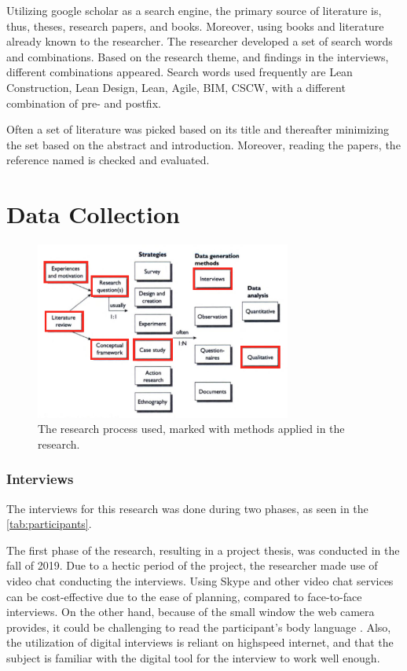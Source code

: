 Utilizing google scholar as a search engine, the primary source of literature is, thus, theses, research papers, and books. Moreover, using books and literature already known to the researcher. The researcher developed a set of search words and combinations. Based on the research theme, and findings in the interviews, different combinations appeared. Search words used frequently are Lean Construction, Lean Design, Lean, Agile, BIM, CSCW, with a different combination of pre- and postfix. 

Often a set of literature was picked based on its title and thereafter minimizing the set based on the abstract and introduction. Moreover, reading the papers, the reference named is checked and evaluated. 

\section{Data Collection}
\begin{figure}
    \begin{center}
        \includegraphics[width=0.75\textwidth]{fig/research_process_master.png}
        \caption{The research process used, marked with methods applied in the research.}
        \label{fig:research_process_master}
    \end{center}
\end{figure}

\subsubsection{Interviews}
The interviews for this research was done during two phases, as seen in the \ref{tab:participants}. 

The first phase of the research, resulting in a project thesis, was conducted in the fall of 2019. Due to a hectic period of the project, the researcher made use of video chat conducting the interviews. Using Skype and other video chat services can be cost-effective due to the ease of planning, compared to face-to-face interviews. On the other hand, because of the small window the web camera provides, it could be challenging to read the participant's body language \citep{cater2011skype}.  Also, the utilization of digital interviews is reliant on highspeed internet, and that the subject is familiar with the digital tool for the interview to work well enough.

